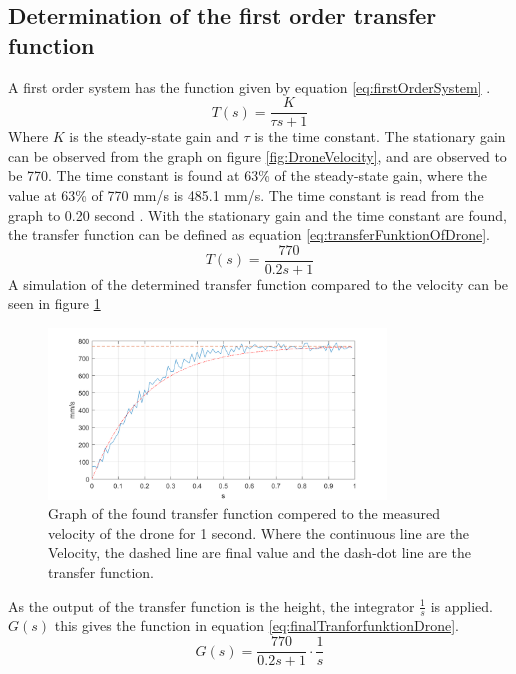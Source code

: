 \subsection*{Determination of the first order transfer function}
A first order system has the function given by equation \ref{eq:firstOrderSystem} \cite{Bolton2002}.
\begin{equation}\label{eq:firstOrderSystem}
    T(s)=\frac{K}{\tau s + 1}
\end{equation}
Where $K$ is the steady-state gain and $\tau$ is the time constant. 
The stationary gain can be observed from the graph on figure \ref{fig:DroneVelocity}, and are observed to be 770. 
The time constant is found at 63\% of the steady-state gain, where the value at 63\% of 770 mm/s is 485.1 mm/s. 
The time constant is read from the graph to 0.20 second \cite{Bolton2002}.
With the stationary gain and the time constant are found, the transfer function can be defined as equation \ref{eq:transferFunktionOfDrone}.
\begin{equation}\label{eq:transferFunktionOfDrone}
    T(s)=\frac{770}{0.2 s + 1}
\end{equation}
A simulation of the determined transfer function compared to the velocity can be seen in figure \ref{fig:Deter_transfor_function} 
\begin{figure}[h]
    \centering
    \includegraphics[width=0.8\textwidth]{figures/ch_movement/TransferFuntionDrone.png}
    \caption{Graph of the found transfer function compered to the measured velocity of the drone for 1 second. Where the continuous line are the Velocity, the dashed line are final value and the dash-dot line are the transfer function.}
    \label{fig:Deter_transfor_function}
\end{figure}
\newline
As the output of the transfer function is the height, the integrator $\frac{1}{s}$ is applied. $G(s)$ this gives the function in equation \ref{eq:finalTranforfunktionDrone}.
\begin{equation}\label{eq:finalTranforfunktionDrone}
    G(s) = \frac{770}{0.2 s+1}\cdot \frac{1}{s}
\end{equation}
